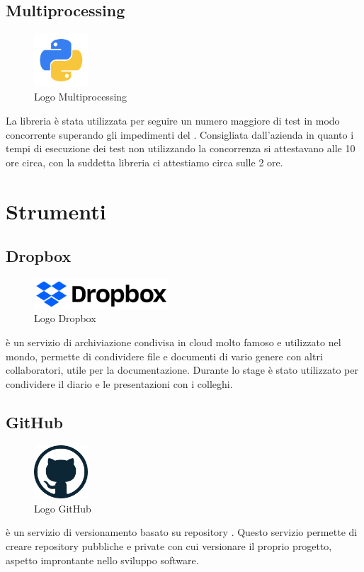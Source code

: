 \subsection{Multiprocessing}
\begin{figure}[H]
	\begin{center} \includegraphics[width=2cm]{figures/python}
		\caption[Logo Multiprocessing]{Logo Multiprocessing}  
	\end{center}
\end{figure}
La libreria  è stata utilizzata per seguire un numero maggiore di test in modo concorrente superando gli impedimenti del . Consigliata dall'azienda in quanto i tempi di esecuzione dei test non utilizzando la concorrenza si attestavano alle 10 ore circa, con la suddetta libreria ci attestiamo circa sulle 2 ore.

\section{Strumenti}
\subsection{Dropbox}
\begin{figure}[H]
	\begin{center} \includegraphics[width=5cm]{figures/dropbox_2017_logo}
		\caption[Logo Dropbox]{Logo Dropbox}  
	\end{center}
\end{figure}
 è un servizio di archiviazione condivisa in cloud molto famoso e utilizzato nel mondo, permette di condividere file e documenti di vario genere con altri collaboratori, utile per la documentazione. Durante lo stage è stato utilizzato per condividere il diario e le presentazioni con i colleghi.

\subsection{GitHub}
\begin{figure}[H]
	\begin{center} \includegraphics[width=2cm]{figures/github-logo}
		\caption[Logo GitHub]{Logo GitHub}  
	\end{center}
\end{figure}
 è un servizio di versionamento basato su repository . Questo servizio permette di creare repository pubbliche e private con cui versionare il proprio progetto, aspetto improntante nello sviluppo software.


